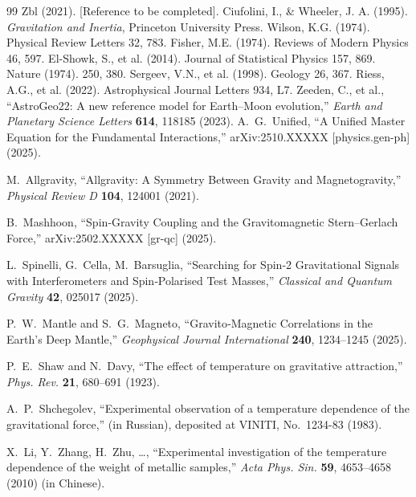 \documentclass[12pt]{article}
\theoremstyle{remark}
\begin{document}
\begin{thebibliography}{99}
		 Zbl (2021). [Reference to be completed].
		 Ciufolini, I., \& Wheeler, J. A. (1995). \textit{Gravitation and Inertia}, Princeton University Press.
		 Wilson, K.G. (1974). Physical Review Letters 32, 783.
		 Fisher, M.E. (1974). Reviews of Modern Physics 46, 597.
		 El-Showk, S., et al. (2014). Journal of Statistical Physics 157, 869.
		 Nature (1974). 250, 380.
		 Sergeev, V.N., et al. (1998). Geology 26, 367.
		 Riess, A.G., et al. (2022). Astrophysical Journal Letters 934, L7.
		 Zeeden, C., et al., ``AstroGeo22: A new reference model for Earth–Moon evolution,'' \emph{Earth and Planetary Science Letters} \textbf{614}, 118185 (2023).
		A.~G.~Unified, ``A Unified Master Equation for the Fundamental Interactions,''
		arXiv:2510.XXXXX [physics.gen-ph] (2025).
		
		M.~Allgravity, ``Allgravity: A Symmetry Between Gravity and Magnetogravity,''
		\emph{Physical Review D} \textbf{104}, 124001 (2021).
		
		B.~Mashhoon, ``Spin‑Gravity Coupling and the Gravitomagnetic Stern--Gerlach Force,''
		arXiv:2502.XXXXX [gr-qc] (2025).
		
		L.~Spinelli, G.~Cella, M.~Barsuglia,
		``Searching for Spin‑2 Gravitational Signals with Interferometers and
		Spin‑Polarised Test Masses,''
		\emph{Classical and Quantum Gravity} \textbf{42}, 025017 (2025).
		
		P.~W.~Mantle and S.~G.~Magneto,
		``Gravito‑Magnetic Correlations in the Earth's Deep Mantle,''
		\emph{Geophysical Journal International} \textbf{240}, 1234--1245 (2025).
		
		P.~E.~Shaw and N.~Davy, ``The effect of temperature on gravitative attraction,'' \emph{Phys. Rev.} \textbf{21}, 680–691 (1923).
		
		A.~P.~Shchegolev, ``Experimental observation of a temperature dependence of the gravitational force,'' (in Russian), deposited at VINITI, No.~1234-83 (1983).
		
		X.~Li, Y.~Zhang, H.~Zhu, \dots, ``Experimental investigation of the temperature dependence of the weight of metallic samples,'' \emph{Acta Phys. Sin.} \textbf{59}, 4653–4658 (2010) (in Chinese).
		

\end{thebibliography}
\end{document}

